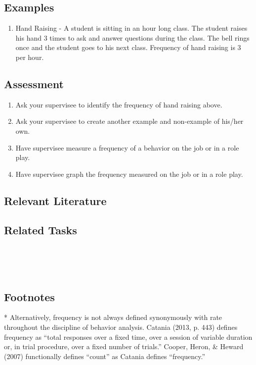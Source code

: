 \subsection{Examples}
\begin{enumerate}
\item Hand Raising - A student is sitting in an hour long class. The student raises his hand 3 times to ask and answer questions during the class. The bell rings once and the student goes to his next class. Frequency of hand raising is 3 per hour.
\end{enumerate}
% 
\subsection{Assessment} 
\begin{enumerate}
\item Ask your supervisee to identify the frequency of hand raising above.
\item Ask your supervisee to create another example and non-example of his/her own.
\item Have supervisee measure a frequency of a behavior on the job or in a role play.
\item Have supervisee graph the frequency measured on the job or in a role play.
\end{enumerate}
%
\subsection{Relevant Literature}
\begin{refsection}
\nocite{test,alang2017police,clayton2018black}
\printbibliography[heading=none]
\end{refsection}

\subsection{Related Tasks} 
\fouriOne{}\\
\fourhOne{}\\
\fourFKFourtySeven{}\\
%
\subsection{Footnotes}
* Alternatively, frequency is not always defined synonymously with rate throughout the discipline of behavior analysis. Catania (2013, p. 443) defines frequency as ``total responses over a fixed time, over a session of variable duration or, in trial procedure, over a fixed number of trials.'' Cooper, Heron, \& Heward (2007) functionally defines ``count'' as Catania defines ``frequency.''
%
%
%
%
%
%
%
%
%
%
%
%
%
